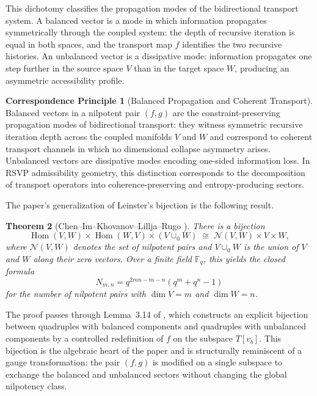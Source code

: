 \documentclass[12pt, a4paper]{article}
\theoremstyle{plain}
\newtheorem{theorem}{Theorem}[section]
\theoremstyle{definition}
\theoremstyle{correspondence}
\newtheorem{corrprin}[theorem]{Correspondence Principle}
\DeclareMathOperator{\Hom}{Hom}
\newcommand{\NN}{\mathcal{N}}
\begin{document}
This dichotomy classifies the propagation modes of the bidirectional transport system.
A balanced vector is a mode in which information propagates symmetrically through the
coupled system: the depth of recursive iteration is equal in both spaces, and the
transport map $f$ identifies the two recursive histories. An unbalanced vector is a
dissipative mode: information propagates one step further in the source space $V$ than
in the target space $W$, producing an asymmetric accessibility profile.

\begin{corrprin}[Balanced Propagation and Coherent Transport]
\label{cp:balanced}
Balanced vectors in a nilpotent pair $(f,g)$ are the constraint-preserving propagation
modes of bidirectional transport: they witness symmetric recursive iteration depth
across the coupled manifolds $V$ and $W$ and correspond to coherent transport channels
in which no dimensional collapse asymmetry arises. Unbalanced vectors are dissipative
modes encoding one-sided information loss. In RSVP admissibility geometry, this
distinction corresponds to the decomposition of transport operators into
coherence-preserving and entropy-producing sectors.
\end{corrprin}

The paper's generalization of Leinster's bijection is the following result.

\begin{theorem}[Chen--Im--Khovanov--Lillja--Rugo \cite{CIKLR25}]
\label{thm:CIKLR-main}
There is a bijection
\[
\Hom(V,W) \times \Hom(W,V) \times (V \cup_0 W) \;\cong\; \NN(V,W) \times V \times W,
\]
where $\NN(V,W)$ denotes the set of nilpotent pairs and $V \cup_0 W$ is the union of
$V$ and $W$ along their zero vectors. Over a finite field $\mathbb{F}_q$, this yields
the closed formula
\[
N_{m,n} = q^{2mn - m - n}(q^m + q^n - 1)
\]
for the number of nilpotent pairs with $\dim V = m$ and $\dim W = n$.
\end{theorem}

The proof passes through Lemma~3.14 of \cite{CIKLR25}, which constructs an explicit
bijection between quadruples with balanced components and quadruples with unbalanced
components by a controlled redefinition of $f$ on the subspace $T[v_b]$. This bijection
is the algebraic heart of the paper and is structurally reminiscent of a gauge
transformation: the pair $(f,g)$ is modified on a single subspace to exchange the
balanced and unbalanced sectors without changing the global nilpotency class.
\end{document}
